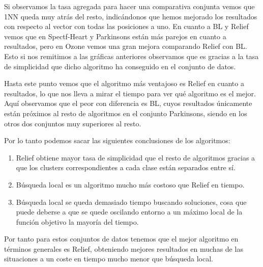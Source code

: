 \documentclass[12pt,a4paper]{article}
\begin{document}
	Si observamos la tasa agregada para hacer una comparativa conjunta vemos que 1NN queda muy atrás del resto, indicándonos que hemos mejorado los resultados con respecto al vector con todas las posiciones a uno. En cuanto a BL y Relief vemos que en Spectf-Heart y Parkinsons están más parejos en cuanto a resultados, pero en Ozone vemos una gran mejora comparando Relief con BL. Esto si nos remitimos a las gráficas anteriores observamos que es gracias a la tasa de simplicidad que dicho algoritmo ha conseguido en el conjunto de datos. 
	
	Hasta este punto vemos que el algoritmo más ventajoso es Relief en cuanto a resultados, lo que nos lleva a mirar el tiempo para ver qué algoritmo es el mejor. Aquí observamos que el peor con diferencia es BL, cuyos resultados únicamente están próximos al resto de algoritmos en el conjunto Parkinsons, siendo en los otros dos conjuntos muy superiores al resto.
	
	Por lo tanto podemos sacar las siguientes conclusiones de los algoritmos:
	\begin{enumerate}
		\item Relief obtiene mayor tasa de simplicidad que el resto de algoritmos gracias a que los clusters correspondientes a cada clase están separados entre sí.
		\item Búsqueda local es un algoritmo mucho más costoso que Relief en tiempo.
		\item Búsqueda local se queda demasiado tiempo buscando soluciones, cosa que puede deberse a que se quede oscilando entorno a un máximo local de la función objetivo la mayoría del tiempo.
	\end{enumerate}
	
	Por tanto para estos conjuntos de datos tenemos que el mejor algoritmo en términos generales es Relief, obteniendo mejores resultados en muchas de las situaciones a un coste en tiempo mucho menor que búsqueda local.
	
\end{document}
